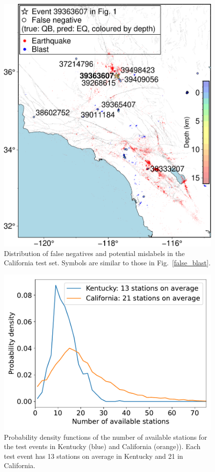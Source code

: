 \documentclass[12pt]{article}
\begin{document}
\begin{figure}
	\centering
	\includegraphics[width=.98\textwidth]{false_negative.pdf}
	\caption{Distribution of false negatives and potential mislabels in the California test set. Symbols are similar to those in Fig.~\ref{false_blast}.}
\end{figure}

\begin{figure}
	\centering
	\includegraphics[width=.5\textwidth]{hist_nstation.pdf}
	\caption{Probability density functions of the number of available stations for the test events in Kentucky (blue) and California (orange)). Each test event has 13 stations on average in Kentucky and 21 in California.}
\end{figure}
\end{document}
